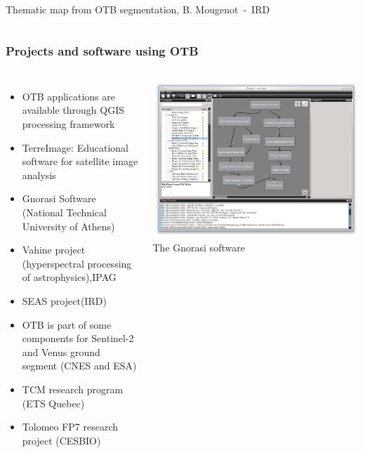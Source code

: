 \documentclass[8pt]{beamer}
\begin{document}
\begin{frame}
\begin{columns}
\tiny{Thematic map from OTB segmentation, B. Mougenot~-~IRD}
\end{columns}
\end{frame}

\begin{frame}
\frametitle{Projects and software using OTB}
\begin{columns}
  \begin{itemize}
    \item OTB applications are available through QGIS processing framework
    \item TerreImage: Educational software for satellite image analysis
    \item Gnorasi Software (National Technical University of Athens)
    \item Vahine project (hyperspectral processing of astrophysics),IPAG
    \item SEAS project(IRD)
    \item OTB is part of some components for \alert{Sentinel-2} and Venus ground segment (CNES and ESA)
    \item TCM research program (ETS Quebec)
    \item Tolomeo FP7 research project (CESBIO)
  \end{itemize}
  \includegraphics[width=\textwidth]{images/gnorasi2.png}\\
  \tiny{The Gnorasi software}
\end{columns}
\end{frame}
\end{document}
